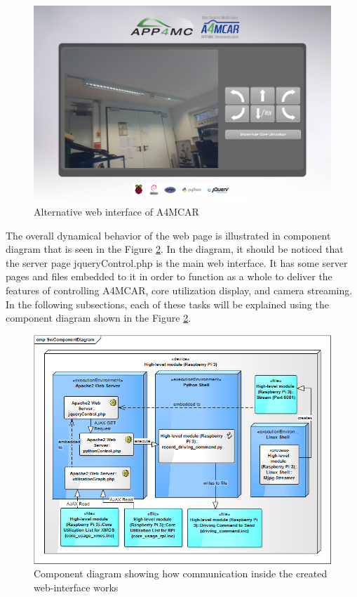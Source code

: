 \begin{figure}[!ht]
	\centering
	\captionsetup{justification=centering}
	\includegraphics[width=\textwidth]{content/images/web2.png}
	\caption{Alternative web interface of A4MCAR}
	\label{fig:web2}
\end{figure}

The overall dynamical behavior of the web page is illustrated in component diagram that is seen in the Figure \ref{fig:weboverallbehavior}. In the diagram, it should be noticed that the server page jqueryControl.php is the main web interface. It has some server pages and files embedded to it in order to function as a whole to deliver the features of controlling A4MCAR, core utilization display, and camera streaming. In the following subsections, each of these tasks will be explained using the component diagram shown in the Figure \ref{fig:weboverallbehavior}.

\begin{figure}[!ht]
	\centering
	\captionsetup{justification=centering}
	\includegraphics[width=\textwidth]{content/images/weboverallbehavior.png}
	\caption{Component diagram showing how communication inside the created web-interface works}
	\label{fig:weboverallbehavior}
\end{figure}

